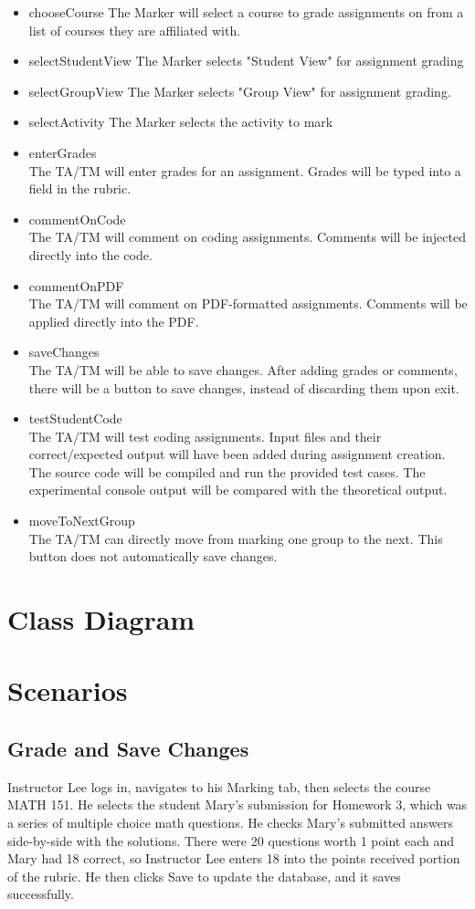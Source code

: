 \documentclass{article}
\begin{document}
\begin{itemize}
  \item chooseCourse
The Marker will select a course to grade assignments on from a list of courses they are affiliated with.
  \item selectStudentView
The Marker selects "Student View" for assignment grading
  \item selectGroupView
The Marker selects "Group View" for assignment grading.
  \item selectActivity
The Marker selects the activity to mark
\item enterGrades \hfill \\
The TA/TM will enter grades for an assignment.  Grades will be typed into a field in the rubric.
\item commentOnCode \hfill \\
The TA/TM will comment on coding assignments.  Comments will be injected directly into the code.
\item commentOnPDF \hfill \\
The TA/TM will comment on PDF-formatted assignments.  Comments will be applied directly into the PDF.
\item saveChanges \hfill \\
The TA/TM will be able to save changes.  After adding grades or comments, there will be a button to save changes, instead of discarding them upon exit.
\item testStudentCode \hfill \\
The TA/TM will test coding assignments.  Input files and their correct/expected output will have been added during assignment creation.  The source code will be compiled and run the provided test cases.  The experimental console output will be compared with the theoretical output.
\item moveToNextGroup \hfill \\
The TA/TM can directly move from marking one group to the next.  This button does not automatically save changes.
\end{itemize}



\section{Class Diagram}

\section{Scenarios}
\subsection{Grade and Save Changes}
Instructor Lee logs in, navigates to his Marking tab, then selects the course MATH 151.
He selects the student Mary’s submission for Homework 3, which was a series of multiple
choice math questions. He checks Mary’s submitted answers side-by-side with the solutions.
There were 20 questions worth 1 point each and Mary had 18 correct, so Instructor
Lee enters 18 into the points received portion of the rubric. He then clicks Save to update
the database, and it saves successfully.
\end{document}
